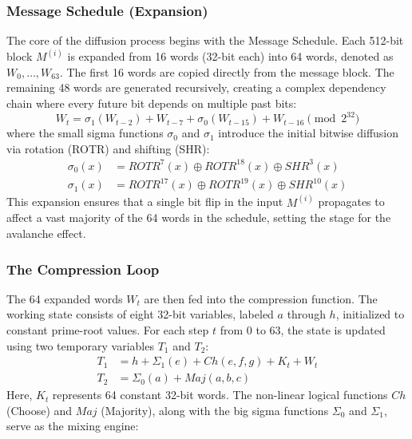 \subsubsection{Message Schedule (Expansion)}
The core of the diffusion process begins with the Message Schedule. Each 512-bit block $M^{(i)}$ is expanded from 16 words (32-bit each) into 64 words, denoted as $W_0, \dots, W_{63}$.
The first 16 words are copied directly from the message block. The remaining 48 words are generated recursively, creating a complex dependency chain where every future bit depends on multiple past bits:
\begin{equation}
    W_t = \sigma_1(W_{t-2}) + W_{t-7} + \sigma_0(W_{t-15}) + W_{t-16} \pmod{2^{32}}
\end{equation}
where the small sigma functions $\sigma_0$ and $\sigma_1$ introduce the initial bitwise diffusion via rotation (ROTR) and shifting (SHR):
\begin{align}
    \sigma_0(x) &= ROTR^{7}(x) \oplus ROTR^{18}(x) \oplus SHR^{3}(x) \\
    \sigma_1(x) &= ROTR^{17}(x) \oplus ROTR^{19}(x) \oplus SHR^{10}(x)
\end{align}
This expansion ensures that a single bit flip in the input $M^{(i)}$ propagates to affect a vast majority of the 64 words in the schedule, setting the stage for the avalanche effect.

\subsubsection{The Compression Loop}
The 64 expanded words $W_t$ are then fed into the compression function. The working state consists of eight 32-bit variables, labeled $a$ through $h$, initialized to constant prime-root values. For each step $t$ from 0 to 63, the state is updated using two temporary variables $T_1$ and $T_2$:
\begin{align}
    T_1 &= h + \Sigma_1(e) + Ch(e, f, g) + K_t + W_t \\
    T_2 &= \Sigma_0(a) + Maj(a, b, c)
\end{align}
Here, $K_t$ represents 64 constant 32-bit words. The non-linear logical functions $Ch$ (Choose) and $Maj$ (Majority), along with the big sigma functions $\Sigma_0$ and $\Sigma_1$, serve as the mixing engine:

